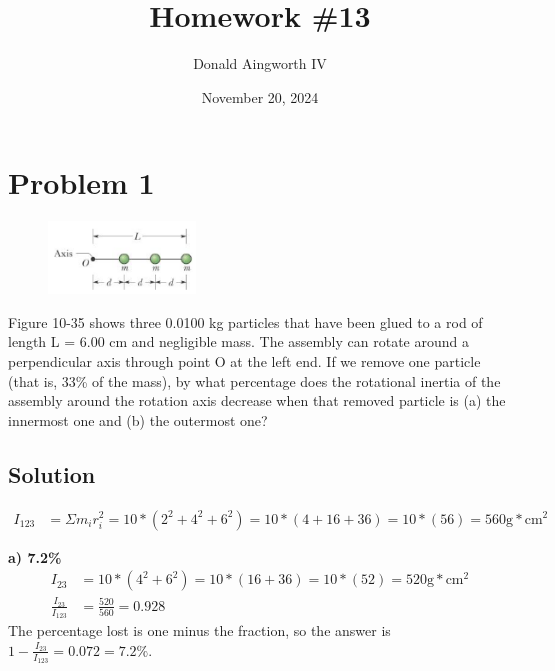 \documentclass[12pt]{article}
\title{Homework \#13}
\author{Donald Aingworth IV}
\date{November 20, 2024}
\begin{document}

\maketitle

\pagebreak

\section*{Problem 1}
\begin{figure}
    \vspace{-30pt}
    \includegraphics[width=0.35\textwidth]{graph_1.png} 
\end{figure}
Figure 10-35 shows three 0.0100 kg particles that have been glued to a rod of length L = 6.00
cm and negligible mass. The assembly can rotate around a perpendicular axis through point O at
the left end. If we remove one particle (that is, 33\% of the mass), by what percentage does the
rotational inertia of the assembly around the rotation axis decrease when that removed particle
is (a) the innermost one and (b) the outermost one?

\subsection*{Solution}
\begin{align*}
    I_{123} &=  \Sigma m_i r_i^2
        =   10 * (2^2 + 4^2 + 6^2)
        =   10 * (4 + 16 + 36)
        =   10 * (56)
        =   560 \unit{\gram * \centi\meter^2}
\end{align*}

\textbf{a) 7.2\%}
\begin{align*}
    I_{23}  &=  10 * (4^2 + 6^2)
        =   10 * (16 + 36)
        =   10 * (52)
        =   520 \unit{\gram * \centi\meter^2}\\
    \frac{I_{23}}{I_{123}}  &=  \frac{520}{560}
        =   0.928
\end{align*}
The percentage lost is one minus the fraction, so the answer is $1 - \frac{I_{23}}{I_{123}} = 0.072 = \boxed{7.2\%}$.
\end{document}
